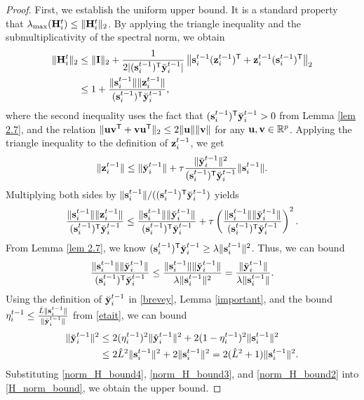 \documentclass[10pt,a4paper]{amsart}
\newcommand{\R}{\mathbb{R}}
\newcommand{\m}[1]{{\bf{#1}}}
\newcommand{\tr}{^{\sf T}}
\begin{document}
\begin{proof}
	First, we establish the uniform upper bound. It is a standard property that $\lambda_{\max}({\m{H}}_i^{t}) \leq \|{\m{H}}_i^{t}\|_2$. By applying the triangle inequality and the submultiplicativity of the spectral norm, we obtain
	\begin{align}\label{H_norm_bound}
		\|{\m{H}}_i^{t}\|_2 &\leq \|\m{I}\|_2 + \frac{1}{2|(\m{s}^{t-1}_{i})\tr\breve{\m{y}}^{t-1}_i|} \left\| \m{s}^{t-1}_{i}(\m{z}^{t-1}_i)\tr + \m{z}^{t-1}_i(\m{s}^{t-1}_{i})\tr \right\|_2 \notag \\
		&\leq 1 + \frac{\|\m{s}^{t-1}_{i}\|\|\m{z}^{t-1}_i\|}{(\m{s}^{t-1}_{i})\tr\breve{\m{y}}^{t-1}_i},
	\end{align}
	where the second inequality uses the fact that $(\m{s}^{t-1}_{i})\tr\breve{\m{y}}^{t-1}_i > 0$ from Lemma \ref{lem 2.7}, and the relation $\|\m{u}\m{v}\tr + \m{v}\m{u}\tr\|_2 \leq 2\|\m{u}\|\|\m{v}\|$ for any $\m{u},\m{v} \in \R^p$.
	Applying the triangle inequality to the definition of $\m{z}^{t-1}_i$, we get
	$$
	\|\m{z}^{t-1}_i\| \leq \|\breve{\m{y}}^{t-1}_i\| + \tau \frac{\|\breve{\m{y}}^{t-1}_i\|^2}{(\m{s}^{t-1}_{i})\tr\breve{\m{y}}^{t-1}_i} \|\m{s}^{t-1}_{i}\|.
	$$
	Multiplying both sides by $\|\m{s}^{t-1}_{i}\| / ((\m{s}^{t-1}_{i})\tr\breve{\m{y}}^{t-1}_i)$ yields
	\begin{equation}\label{norm_H_bound2}
		\frac{\|\m{s}^{t-1}_{i}\|\|\m{z}^{t-1}_i\|}{(\m{s}^{t-1}_{i})\tr\breve{\m{y}}^{t-1}_i} \leq \frac{\|\m{s}^{t-1}_{i}\|\|\breve{\m{y}}^{t-1}_i\|}{(\m{s}^{t-1}_{i})\tr\breve{\m{y}}^{t-1}_i} + \tau \left( \frac{\|\m{s}^{t-1}_{i}\|\|\breve{\m{y}}^{t-1}_i\|}{(\m{s}^{t-1}_{i})\tr\breve{\m{y}}^{t-1}_i} \right)^2.
	\end{equation}
	From Lemma \ref{lem 2.7}, we know $(\m{s}^{t-1}_{i})\tr\breve{\m{y}}^{t-1}_i \geq \lambda\|\m{s}^{t-1}_{i}\|^2$. Thus, we can bound 
	\begin{equation}\label{norm_H_bound3}
		\frac{\|\m{s}^{t-1}_{i}\|\|\breve{\m{y}}^{t-1}_i\|}{(\m{s}^{t-1}_{i})\tr\breve{\m{y}}^{t-1}_i} \leq \frac{\|\m{s}^{t-1}_{i}\|\|\breve{\m{y}}^{t-1}_i\|}{\lambda\|\m{s}^{t-1}_{i}\|^2} = \frac{\|\breve{\m{y}}^{t-1}_i\|}{\lambda\|\m{s}^{t-1}_{i}\|}.
	\end{equation}
	Using the definition of $\breve{\m{y}}^{t-1}_i$ in \eqref{brevey}, Lemma \ref{important}, and the bound $\eta_i^{t-1} \leq  \frac{\hat{L}\|\m{s}^{t-1}_i\|}{\|\check{\m{y}}^{t-1}_i\|}$ from \eqref{etait}, we can bound 
	\begin{align}\label{norm_H_bound4}
		\|\breve{\m{y}}^{t-1}_i\|^2 &\leq 2(\eta_i^{t-1})^2\|\check{\m{y}}^{t-1}_i\|^2 + 2(1-\eta_i^{t-1})^2\|\m{s}^{t-1}_{i}\|^2 \notag\\
		&\leq 2\hat{L}^2\|\m{s}^{t-1}_{i}\|^2 + 2\|\m{s}^{t-1}_{i}\|^2 = 2(\hat{L}^2+1)\|\m{s}^{t-1}_{i}\|^2.
	\end{align}
	Substituting \eqref{norm_H_bound4}, \eqref{norm_H_bound3}, and \eqref{norm_H_bound2} into \eqref{H_norm_bound}, we obtain the upper bound.
	

\end{proof}
\end{document}

